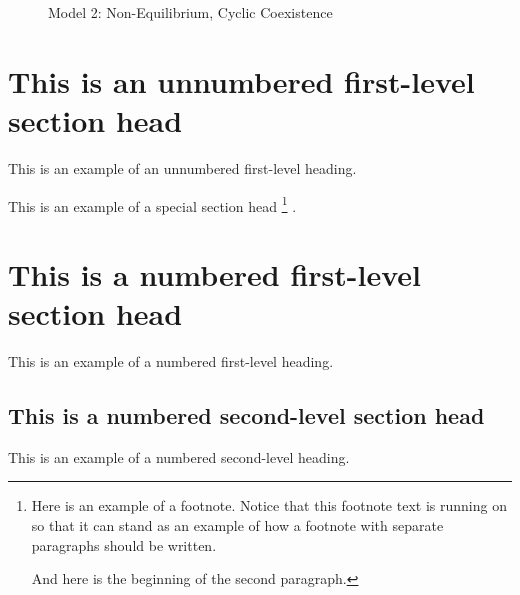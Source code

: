 \documentclass{amsart}
\theoremstyle{definition}
\theoremstyle{remark}
\numberwithin{equation}{section}
\begin{document}
\begin{centering}
\begin{figure}[h]
		\caption{Model 2: Non-Equilibrium, Cyclic Coexistence}
		\label{fig:variable_growth_stable_cycles}
	\end{figure}
\end{centering}





\section*{This is an unnumbered first-level section head}
This is an example of an unnumbered first-level heading.

This is an example of a special section head%
\footnote{Here is an example of a footnote. Notice that this footnote
text is running on so that it can stand as an example of how a footnote
with separate paragraphs should be written.
\par
And here is the beginning of the second paragraph.}%
.

\section{This is a numbered first-level section head}
This is an example of a numbered first-level heading.

\subsection{This is a numbered second-level section head}
This is an example of a numbered second-level heading.
\end{document}
